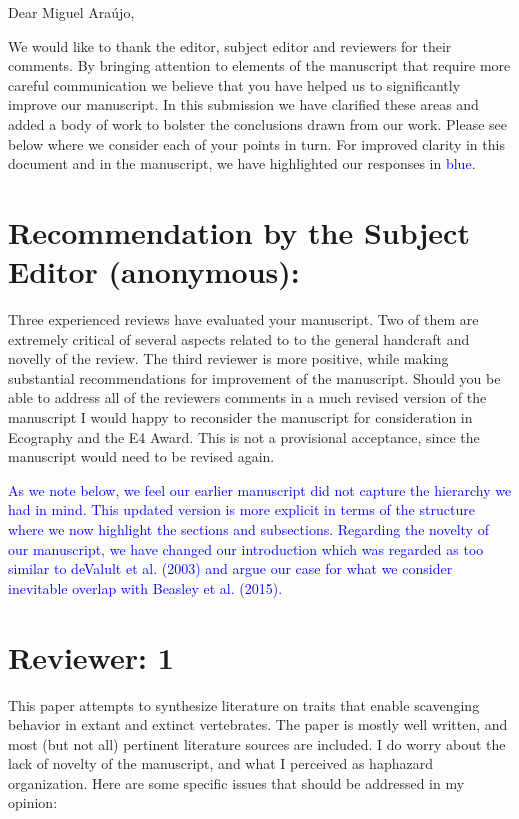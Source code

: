 \documentclass[12pt,letterpaper]{article}
\begin{document}
Dear Miguel Ara\'{u}jo,

\bigskip

We would like to thank the editor, subject editor and reviewers for their comments. By bringing attention to elements of the manuscript that require more careful communication we believe that you have helped us to significantly improve our manuscript. In this submission we have clarified these areas and added a body of work to bolster the conclusions drawn from our work. Please see below where we consider each of your points in turn.
For improved clarity in this document and in the manuscript, we have highlighted our responses in \textcolor{blue}{blue}.

\section{Recommendation by the Subject Editor (anonymous):}
Three experienced reviews have evaluated your manuscript.
Two of them are extremely critical of several aspects related to to the general handcraft and novelly of the review.
The third reviewer is more positive, while making substantial recommendations for improvement of the manuscript.
Should you be able to address all of the reviewers comments in a much revised version of the manuscript I would happy to reconsider the manuscript for consideration in Ecography and the E4 Award.
This is not a provisional acceptance, since the manuscript would need to be revised again.

\smallskip

\textcolor{blue}{As we note below, we feel our earlier manuscript did not capture the hierarchy we had in mind.
This updated version is more explicit in terms of the structure where we now highlight the sections and subsections.
Regarding the novelty of our manuscript, we have changed our introduction which was regarded as too similar to deValult et al. (2003) and argue our case for what we consider inevitable overlap with Beasley et al. (2015).} 

\section{Reviewer: 1}
This paper attempts to synthesize literature on traits that enable scavenging behavior in extant and extinct vertebrates.
The paper is mostly well written, and most (but not all) pertinent literature sources are included.
I do worry about the lack of novelty of the manuscript, and what I perceived as haphazard organization. Here are some specific issues that should be addressed in my opinion:
\end{document}
